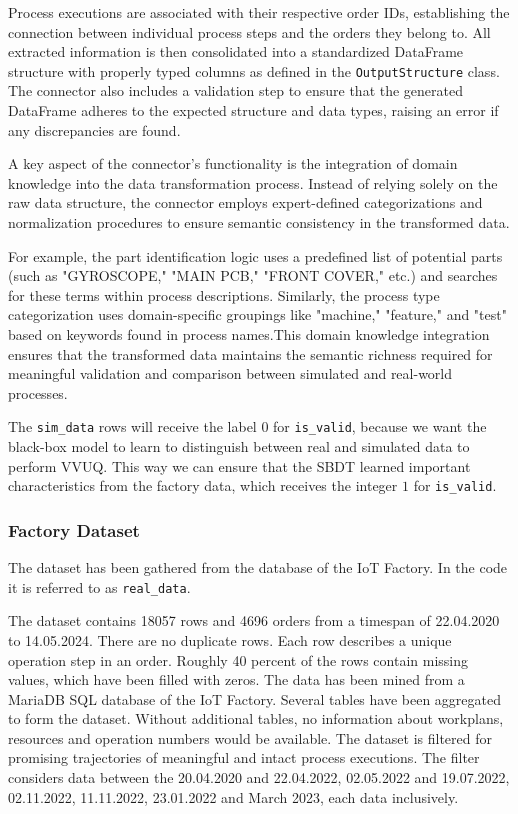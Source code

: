Process executions are associated with their respective order IDs, establishing the connection between individual process steps and the orders they belong to. All extracted information is then consolidated into a standardized DataFrame structure with properly typed columns as defined in the \texttt{OutputStructure} class. The connector also includes a validation step to ensure that the generated DataFrame adheres to the expected structure and data types, raising an error if any discrepancies are found.

A key aspect of the connector's functionality is the integration of domain knowledge into the data transformation process. Instead of relying solely on the raw data structure, the connector employs expert-defined categorizations and normalization procedures to ensure semantic consistency in the transformed data.

For example, the part identification logic uses a predefined list of potential parts (such as "GYROSCOPE," "MAIN PCB," "FRONT COVER," etc.) and searches for these terms within process descriptions. Similarly, the process type categorization uses domain-specific groupings like "machine," "feature," and "test" based on keywords found in process names.This domain knowledge integration ensures that the transformed data maintains the semantic richness required for meaningful validation and comparison between simulated and real-world processes.

The \texttt{sim_data} rows will receive the label $0$ for \texttt{is\_valid}, because we want the black-box model to learn to distinguish between real and simulated data to perform VVUQ. This way we can ensure that the SBDT learned important characteristics from the factory data, which receives the integer $1$ for \texttt{is\_valid}.

\subsubsection{Factory Dataset}

The dataset has been gathered from the database of the IoT Factory. In the code it is referred to as \texttt{real_data}.

The dataset contains 18057 rows and 4696 orders from a timespan of 22.04.2020 to 14.05.2024. There are no duplicate rows. Each row describes a unique operation step in an order. Roughly 40 percent of the rows contain missing values, which have been filled with zeros.
The data has been mined from a MariaDB SQL database of the IoT Factory. Several tables have been aggregated to form the dataset. Without additional tables, no information about workplans, resources and operation numbers would be available. The dataset is filtered for promising trajectories of meaningful and intact process executions. The filter considers data between the 20.04.2020 and 22.04.2022, 02.05.2022 and 19.07.2022, 02.11.2022, 11.11.2022, 23.01.2022 and March 2023, each data inclusively.

